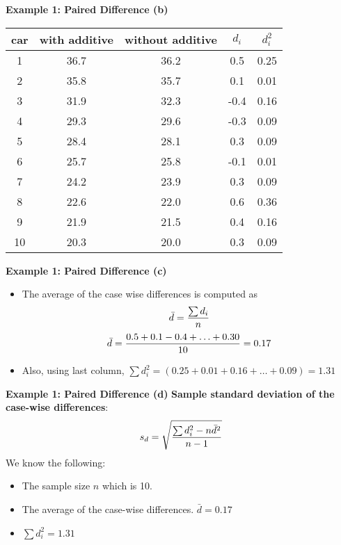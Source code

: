 \documentclass[a4]{beamer}
\begin{document}

\noindent \textbf{Example 1: Paired Difference (b)}
\small
\begin{center}
\begin{tabular}{|c|c|c|c|c|}\hline
car & with additive & without additive & $d_i$ & $d^2_i$\\\hline
1&36.7&36.2&0.5&0.25\\\hline
2&35.8&35.7&0.1&0.01\\\hline
3&31.9&32.3&-0.4&0.16\\\hline
4&29.3&29.6&-0.3&0.09\\\hline
5&28.4&28.1&0.3&0.09\\\hline
6&25.7&25.8&-0.1&0.01\\\hline
7&24.2&23.9&0.3&0.09\\\hline
8&22.6&22.0&0.6&0.36\\\hline
9&21.9&21.5&0.4&0.16\\\hline
10&20.3&20.0&0.3&0.09\\\hline
\end{tabular}
\end{center}



\noindent \textbf{Example 1: Paired Difference (c)}
\begin{itemize}
\item The average of the case wise differences is computed as \[\bar{d} = {\sum d_i \over n}\]
\[ \bar{d} = { 0.5 + 0.1  - 0.4 + \ldots + 0.30 \over 10 }= 0.17 \]
\item Also, using last column, $\sum d^2_i = (0.25 + 0.01 + 0.16 + \ldots + 0.09) = 1.31$
\end{itemize}





\noindent \textbf{Example 1: Paired Difference (d)}
\textbf{Sample standard deviation of the case-wise differences}:
\large
\[s_d = \sqrt{ {\sum d_i^2 - n\bar{d}^2 \over n-1}}\]
\vspace{0.2cm}
We know the following:
\begin{itemize}
\item The sample size $n$ which is 10.
\item The average of the case-wise differences. $\bar{d} = 0.17$
\item  $\sum d^2_i = 1.31$
\end{itemize}
\end{document}
